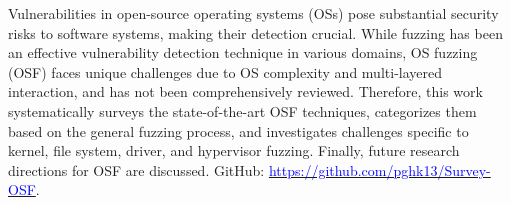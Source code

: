
Vulnerabilities in open-source operating systems (OSs)  pose substantial security risks to software systems, making their detection crucial. While fuzzing has been an effective vulnerability detection technique in various domains, OS fuzzing (OSF) faces unique challenges due to OS complexity and multi-layered interaction, and has not been comprehensively reviewed. Therefore, this work systematically surveys the state-of-the-art OSF techniques, categorizes them based on the general fuzzing process, and investigates challenges specific to kernel, file system, driver, and hypervisor fuzzing. Finally, future research directions for OSF are discussed. GitHub: \href{https://github.com/pghk13/Survey-OSF}{\textcolor{blue}{https://github.com/pghk13/Survey-OSF}}.
